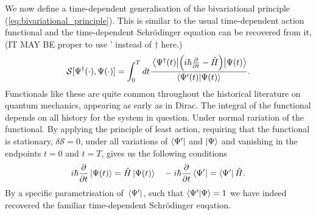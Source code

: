 We now define a time-dependent generalisation of the bivariational principle
(\autoref{eq:bivariational_principle}). This is similar to the usual time-dependent 
action functional and the time-dependent Schrödinger equation can be recovered from 
it,
(IT MAY BE proper to use ' instead of $\dagger$ here.)
\begin{equation}
    \label{eq:time_dependent_action_functional}
    \mathcal{S}[{\Psi}^\dagger(\cdot), \Psi(\cdot)]
        = \int_0^T dt \frac{\mel{{\Psi}^\dagger(t)}{\left(
            i\hbar \frac{\partial}{\partial t} - \hat{H}
        \right)}{\Psi(t)}}{\braket{{\Psi}'(t)}{\Psi(t)}}.
\end{equation}
Functionals like these are quite common throughout the historical literature on 
quantum mechanics, appearing as early as in Dirac\cite{dirac1930principles}. The 
integral of the functional depends on all history for the system in question. 
Under normal rariation of the functional. By applying the principle of least action, 
requiring that the functional is stationary, $\delta\mathcal{S} = 0$, under all variations 
of $\bra{{\Psi}'}$ and $\ket{\Psi}$ and vanishing in the endpoints $t=0$ and
$t=T$, gives us the following conditions
\begin{equation*}
    i\hbar\frac{\partial}{\partial t} \ket{\Psi(t)} = \hat{H}\ket{\Psi(t)}
    \quad -i \hbar \frac{\partial}{\partial t} \bra{{\Psi}'} = \bra{{\Psi}'}\hat{H}.
\end{equation*}
By a specific parametrisation of $\bra*{{\Psi}'}$, such that 
$\braket{{\Psi}'}{\Psi} = 1$ we have indeed recovered the familiar 
time-dependent Schrödinger euqation.

